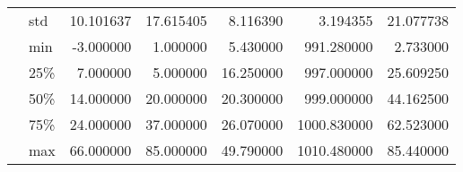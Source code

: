 \begin{tabular}{llrrrrr}
  & std &     10.101637 &     17.615405 &      8.116390 &      3.194355 &     21.077738 \\
  & min &     -3.000000 &      1.000000 &      5.430000 &    991.280000 &      2.733000 \\
  & 25\% &      7.000000 &      5.000000 &     16.250000 &    997.000000 &     25.609250 \\
  & 50\% &     14.000000 &     20.000000 &     20.300000 &    999.000000 &     44.162500 \\
  & 75\% &     24.000000 &     37.000000 &     26.070000 &   1000.830000 &     62.523000 \\
  & max &     66.000000 &     85.000000 &     49.790000 &   1010.480000 &     85.440000 \\
\bottomrule
\end{tabular}
